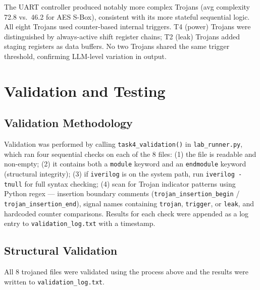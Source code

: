\documentclass[11pt]{article}
\begin{document}
The UART controller produced notably more complex Trojans (avg complexity 72.8 vs.\ 46.2 for AES S-Box), consistent with its more stateful sequential logic. All eight Trojans used counter-based internal triggers. T4 (power) Trojans were distinguished by always-active shift register chains; T2 (leak) Trojans added staging registers as data buffers. No two Trojans shared the same trigger threshold, confirming LLM-level variation in output.

\section{Validation and Testing}
\label{sec:validation}

\subsection{Validation Methodology}

Validation was performed by calling \texttt{task4\_validation()} in \texttt{lab\_runner.py}, which ran four sequential checks on each of the 8 files: (1) the file is readable and non-empty; (2) it contains both a \texttt{module} keyword and an \texttt{endmodule} keyword (structural integrity); (3) if \texttt{iverilog} is on the system path, run \texttt{iverilog -tnull} for full syntax checking; (4) scan for Trojan indicator patterns using Python regex --- insertion boundary comments (\texttt{trojan\_insertion\_begin} / \texttt{trojan\_insertion\_end}), signal names containing \texttt{trojan}, \texttt{trigger}, or \texttt{leak}, and hardcoded counter comparisons. Results for each check were appended as a log entry to \texttt{validation\_log.txt} with a timestamp.

\subsection{Structural Validation}

All 8 trojaned files were validated using the process above and the results were written to \texttt{validation\_log.txt}.
\end{document}
